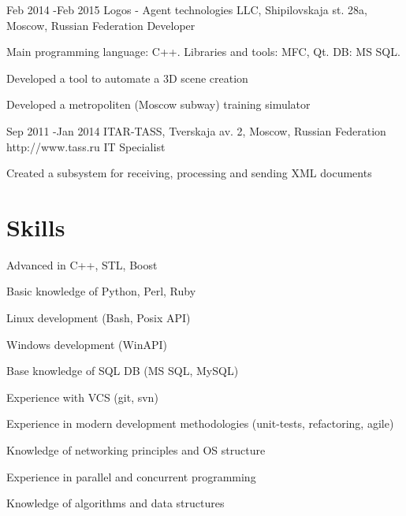 \documentclass[10pt]{article} %
\begin{document}

\job
{Feb 2014 -}{Feb 2015}
{Logos - Agent technologies LLC, Shipilovskaja st. 28a, Moscow, Russian Federation}
{}
{Developer}
{
Main programming language: C++. Libraries and tools: MFC, Qt. DB: MS SQL.
\begin{itemize-noindent}
\setlength\itemsep{0em}
\item{Developed a tool to automate a 3D scene creation}
\item{Developed a metropoliten (Moscow subway) training simulator}
\end{itemize-noindent}
}


\job
{Sep 2011 -}{Jan 2014}
{ITAR-TASS, Tverskaja av. 2, Moscow, Russian Federation}
{http://www.tass.ru}
{IT Specialist}
{
\begin{itemize-noindent}
\setlength\itemsep{0em}
\item{Created a subsystem for receiving, processing and sending XML documents}
\end{itemize-noindent}
}


\section{Skills}

\begin{multicols}{2}
\begin{itemize-noindent}
\setlength\itemsep{0em}
\item Advanced in C++, STL, Boost
\item Basic knowledge of Python, Perl, Ruby
\item Linux development (Bash, Posix API)
\item Windows development (WinAPI)
\item Base knowledge of SQL DB (MS SQL, MySQL)
\item Experience with VCS (git, svn)
\item Experience in modern development methodologies (unit-tests, refactoring, agile)
\item Knowledge of networking principles and OS structure
\item Experience in parallel and concurrent programming
\item Knowledge of algorithms and data structures
\end{itemize-noindent}
\end{multicols}
\end{document}
